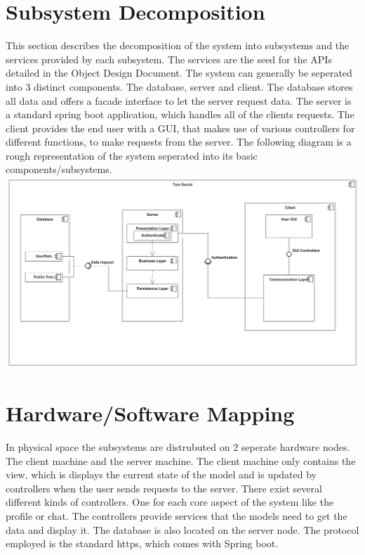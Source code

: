 \documentclass[a4paper,12pt]{scrartcl}
\begin{document}
    \section{Subsystem Decomposition}
    This section describes the decomposition of the system into subsystems and the services provided by each subsystem. The services are the seed for the APIs detailed in the Object Design Document. The system can generally be seperated into 3 distinct components. The database, server and client. The database stores all data and offers a facade interface to let the server request data. The server is a standard spring boot application, which handles all of the clients requests. The client provides the end user with a GUI, that makes use of various controllers for different functions, to make requests from the server. The following diagram is a rough representation of the system seperated into its basic components/subsystems.\\
    	
    	
        \includegraphics[scale=0.15]{ComponentDiagram.png}
  


    \section{Hardware/Software Mapping}
In physical space the subsystems are distrubuted on 2 seperate hardware nodes. The client machine and the server machine. The client machine only contains the view, which is displays the current state of the model and is updated by controllers when the user sends requests to the server. There exist several different kinds of controllers. One for each core aspect of the system like the profile or chat. The controllers provide services that the models need to get the data and display it. The database is also located on the server node. The protocol employed is the standard https, which comes with Spring boot.\\
    
\end{document}
